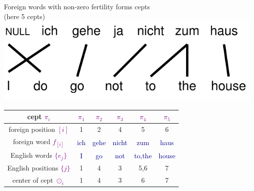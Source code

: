 \documentclass[landscape]{slides}
\newcommand{\example}[1]{\textcolor{darkblue}{\rm #1}}
\newcommand{\maths}[1]{\textcolor{purple}{#1}}
\begin{document}
\begin{center}
Foreign words with non-zero fertility forms cepts\\
(here 5 cepts)\\[10mm]
\includegraphics[scale=1.2]{ich-gehe-ja-nicht-alignment.pdf}\\[10mm]
\begin{tabular}{|c||c|c|c|c|c|} \hline
cept \maths{$\pi_i$} & \maths{$\pi_1$} & \maths{$\pi_2$} & \maths{$\pi_3$} & \maths{$\pi_4$} & \maths{$\pi_5$} \\ \hline
foreign position \maths{$[i]$} & 1 & 2 & 4 & 5 & 6 \\ \hline
foreign word \maths{$f_{[i]}$} & \example{ich} & \example{gehe} & \example{nicht} & \example{zum} & \example{haus} \\ \hline
English words \maths{$\{e_j\}$} & \example{I} & \example{go} & \example{not} & \example{to},\example{the} & \example{house} \\ \hline
English positions \maths{$\{j\}$} & 1 & 4 & 3 & 5,6 & 7 \\ \hline
center of cept \maths{$\odot_i$} & 1 & 4 & 3 & 6 & 7 \\ \hline
\end{tabular}
\end{center}

\end{document}
